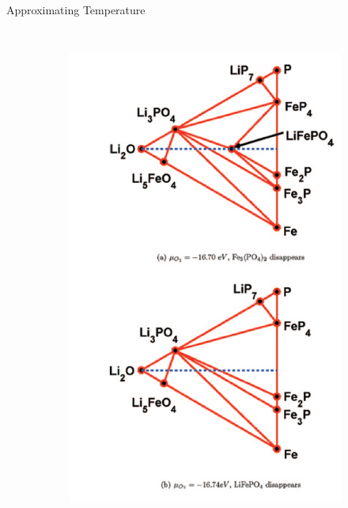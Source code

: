 \documentclass[aspectratio=169]{beamer}
\begin{document}
\begin{frame}{Approximating Temperature}
\begin{columns}
\begin{figure}
\begin{subfigure}{0.47\textwidth}
        \includegraphics[width=\linewidth]{lectures/figures/10_LFP_PD2.png}
    \end{subfigure}
\end{figure} 
\end{columns} 
\end{frame} 
\end{document}
